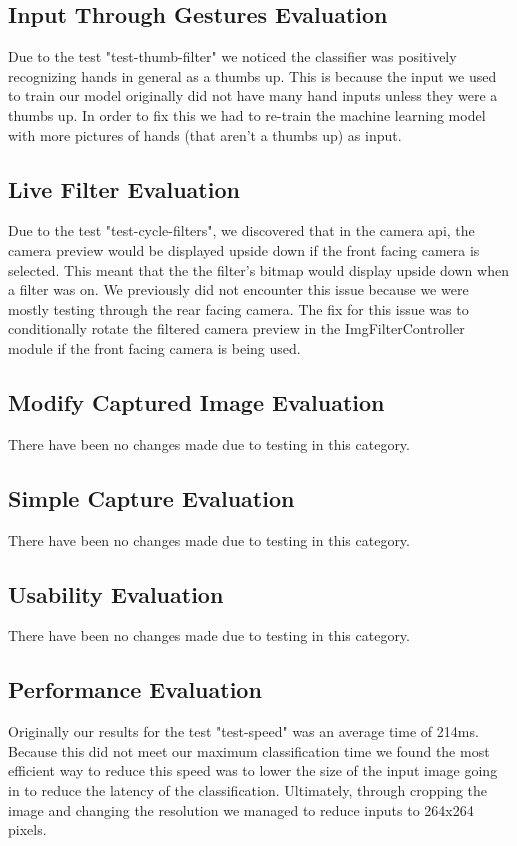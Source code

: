 \documentclass[12pt, titlepage]{article}
\begin{document}
\subsection{Input Through Gestures Evaluation}
Due to the test "test-thumb-filter" we noticed the classifier was positively recognizing hands in general as a thumbs up. This is because the input we used to train our model originally did not have many hand inputs unless they were a thumbs up. In order to fix this we had to re-train the machine learning model with more pictures of hands (that aren't a thumbs up) as input. 

\subsection{Live Filter Evaluation}
Due to the test "test-cycle-filters", we discovered that in the camera api, the camera preview would be displayed upside down if the front facing camera is selected. This meant that the the filter's bitmap would display upside down when a filter was on. We previously did not encounter this issue because we were mostly testing through the rear facing camera. The fix for this issue was to conditionally rotate the filtered camera preview in the ImgFilterController module if the front facing camera is being used.

\subsection{Modify Captured Image Evaluation}
There have been no changes made due to testing in this category.

\subsection{Simple Capture Evaluation}
There have been no changes made due to testing in this category.

\subsection{Usability Evaluation}
There have been no changes made due to testing in this category.

\subsection{Performance Evaluation}
Originally our results for the test "test-speed" was an average time of 214ms. Because this did not meet our maximum classification time we found the most efficient way to reduce this speed was to lower the size of the input image going in to reduce the latency of the classification. Ultimately, through cropping the image and changing the resolution we managed to reduce inputs to 264x264 pixels. 
\end{document}
